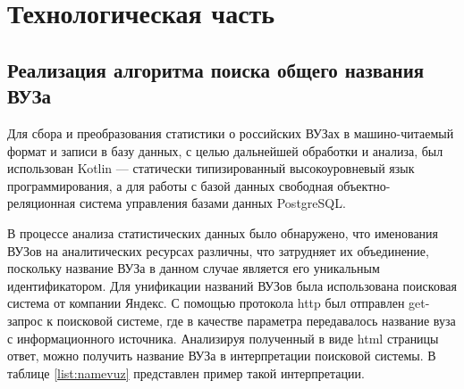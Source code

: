 \section{Технологическая часть}

\subsection{Реализация алгоритма поиска общего названия ВУЗа}

Для сбора и преобразования статистики о российских ВУЗах в машино-читаемый формат и записи в базу данных, с целью дальнейшей обработки и анализа, был использован Kotlin — статически типизированный высокоуровневый язык программирования\cite{Kotlin}, а для работы с базой данных свободная объектно-реляционная система управления базами данных PostgreSQL\cite{postgresql}.

В процессе анализа статистических данных было обнаружено, что именования ВУЗов на аналитических ресурсах различны, что затрудняет их объединение, поскольку название ВУЗа в данном случае является его уникальным идентификатором. Для унификации названий ВУЗов была использована поисковая система от компании Яндекс. С помощью протокола http был отправлен get-запрос к поисковой системе, где в качестве параметра передавалось название вуза с информационного источника. Анализируя полученный в виде html страницы ответ, можно получить название ВУЗа в интерпретации поисковой системы. В таблице \ref{list:namevuz} представлен пример такой интерпретации.

